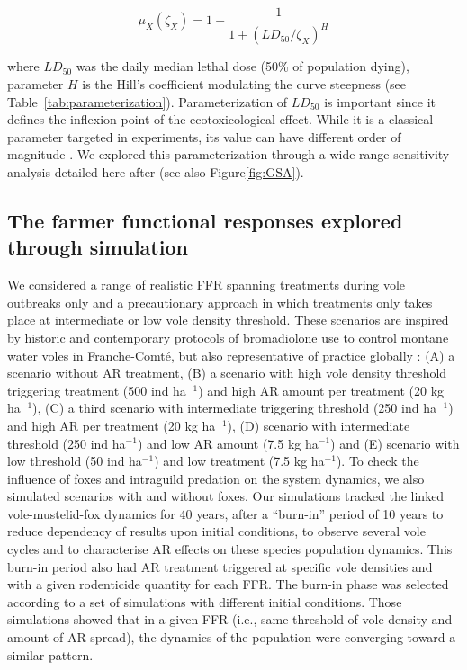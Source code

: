 \documentclass[11pt]{article}
\begin{document}
\begin{equation}
\mu_X(\zeta_X) =   1- \dfrac{1}{1+ (LD_{50}/\zeta_X)^H} 
\label{eq:muX}
\end{equation}

where $LD_{50}$ was the daily median lethal dose (50\% of population dying), parameter $H$ is the Hill's coefficient modulating the curve steepness (see Table~\ref{tab:parameterization}).
%
Parameterization of $LD_{50}$ is important since it defines the inflexion point of the ecotoxicological effect. While it is a classical parameter targeted in experiments, its value can have different order of magnitude  \cite{Grolleau1989,Erickson2004,Sage2010}. We explored this parameterization through a wide-range sensitivity analysis detailed here-after (see also Figure\ref{fig:GSA}).


\subsection{The farmer functional responses explored through simulation}

We considered a range of realistic FFR spanning treatments during vole outbreaks only and a precautionary approach in which treatments only takes place at intermediate or low vole density threshold. These scenarios are inspired by historic and contemporary protocols of bromadiolone use to control montane water voles in Franche-Comté, but also representative of practice globally \citep{Delattre2009}: (A) a scenario without AR treatment, (B) a scenario with high vole density threshold triggering treatment (500 ind ha$^{-1}$) and high AR amount per treatment (20 kg ha$^{-1}$), (C) a third scenario with intermediate triggering threshold (250 ind ha$^{-1}$) and high AR per treatment (20 kg ha$^{-1}$), (D) scenario with intermediate threshold (250 ind ha$^{-1}$) and low AR amount (7.5 kg ha$^{-1}$) and (E) scenario with low threshold (50 ind ha$^{-1}$) and low treatment (7.5 kg ha$^{-1}$).
%
To check the influence of foxes and intraguild predation on the system dynamics, we also simulated scenarios with and without foxes.
%
Our simulations tracked the linked vole-mustelid-fox dynamics for 40 years, after a “burn-in” period of 10 years to reduce dependency of results upon initial conditions, to observe several vole cycles and to characterise AR effects on these species population dynamics. This burn-in period also had AR treatment triggered at specific vole densities and with a given rodenticide quantity for each FFR. The burn-in phase was selected according to a set of simulations with different initial conditions. Those simulations showed that in a given FFR (i.e., same threshold of vole density and amount of AR spread), the dynamics of the population were converging toward a similar pattern. 
\end{document}
